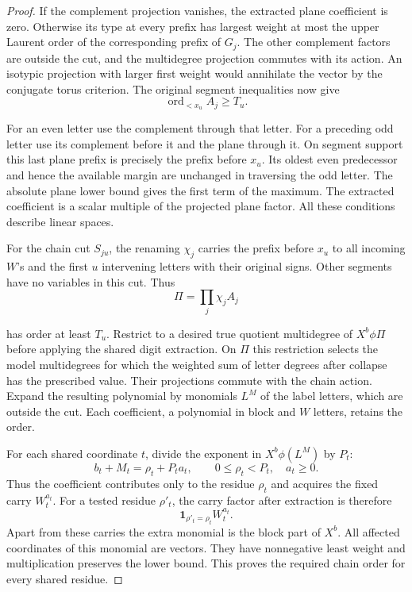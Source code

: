 \begin{proof}
If the complement projection vanishes, the extracted plane
coefficient is zero. Otherwise its type at every prefix has
largest weight at most the upper Laurent order of the corresponding
prefix of \(G_j\). The other complement factors are outside the
cut, and the multidegree projection commutes with its action.
An isotypic projection with larger first weight would annihilate
the vector by the conjugate torus criterion. The original segment
inequalities now give
\[
 \operatorname{ord}_{<x_u} A_j\ge T_u.
\]

For an even letter use the complement through that letter. For a
preceding odd letter use its complement before it and the plane
through it. On segment support this last plane prefix is precisely
the prefix before \(x_u\). Its oldest even predecessor and hence
the available margin are unchanged in traversing the odd letter.
The absolute plane lower bound gives the first term of the maximum.
The extracted coefficient is a scalar multiple of the projected
plane factor. All these conditions describe linear spaces.

For the chain cut \(S_{ju}\), the renaming \(\chi_j\) carries the
prefix before \(x_u\) to all incoming \(W\)'s and the first \(u\)
intervening letters with their original signs. Other segments
have no variables in this cut. Thus
\[
 \Pi=\prod_j\chi_j A_j
\]

has order at least \(T_u\). Restrict to a desired true quotient
multidegree of \(X^b\phi\Pi\) before applying the shared digit
extraction. On \(\Pi\) this restriction selects the model
multidegrees for which the weighted sum of letter degrees after
collapse has the prescribed value. Their projections commute with
the chain action. Expand the resulting polynomial by monomials
\(L^M\) of the label letters, which are outside the cut. Each
coefficient, a polynomial in block and \(W\) letters, retains the
order.

For each shared coordinate \(t\), divide the exponent in
\(X^b\phi(L^M)\) by \(P_t\):
\[
     b_t+M_t=\rho_t+P_t a_t,\qquad 0\le\rho_t<P_t,\quad a_t\ge0 .
\]
Thus the coefficient contributes only to the residue \(\rho_t\)
and acquires the fixed carry \(W_t^{a_t}\). For a tested residue \(\rho'_t\), the carry factor after extraction is therefore
\[
 \mathbf1_{\rho'_t=\rho_t}W_t^{a_t}.
\]
Apart from these carries the extra monomial
is the block part of \(X^b\). All affected coordinates of this monomial are vectors.
They have nonnegative least weight and multiplication preserves
the lower bound. This proves the required chain order for every
shared residue.


\end{proof}
